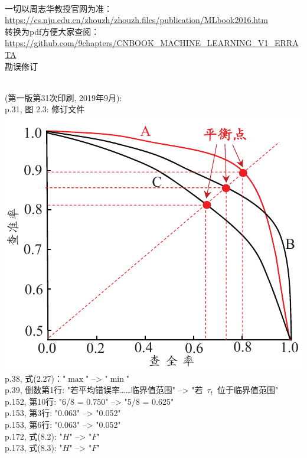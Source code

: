 \documentclass[UTF8]{article}
\begin{document}
\quad\\
一切以周志华教授官网为准：\\
\url{https://cs.nju.edu.cn/zhouzh/zhouzh.files/publication/MLbook2016.htm}\\
转换为pdf方便大家查阅：\\
\url{https://github.com/9chapters/CNBOOK_MACHINE_LEARNING_V1_ERRATA} \\
勘误修订\quad\\ 

\quad\\
(第一版第31次印刷, 2019年9月):\\
p.31, 图 2.3: 修订文件 \\
\includegraphics{pic/Fig23.pdf}\\
p.38, 式(2.27)："$\max$" --> "$\min$" \\
p.39, 倒数第1行: "若平均错误率……临界值范围"  --> "若~$\tau_t$~位于临界值范围" \\
p.152, 第10行: "6/8 = 0.750" --> "5/8 = 0.625" \\
p.153, 第3行: "0.063" --> "0.052" \\
p.153, 第6行: "0.063" --> "0.052" \\
p.172, 式(8.2): "$H$" --> "$F$" \\
p.173, 式(8.3): "$H$" --> "$F$" \\
\end{document}
